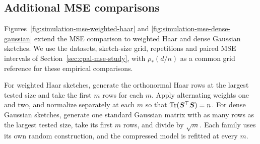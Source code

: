 \documentclass{article}
\theoremstyle{plain} %
\theoremstyle{definition} %
\theoremstyle{definition} %
\begin{document}
\begin{table}[!htbp]
    \centering
    \footnotesize
    \setlength{\tabcolsep}{2.5pt}
    \caption{Paired empirical bias at $n=1000$ in the expanded
    risk-curve study, with 1,000 repetitions per setting. Parentheses
    contain Monte Carlo standard errors of the empirical mean biases. Dashes have the same meaning as in
    Table~\ref{tab:simulation-noninterpolating}, as do WH, DG, G, and U.}
    \label{tab:appendix-accuracy-bias}
    
\end{table}

\begin{table}[tb]
    \centering
    \footnotesize
    \setlength{\tabcolsep}{2.5pt}
    \caption{Empirical RMSE at $n=1000$ in the expanded risk-curve
    study, with 1,000 repetitions per setting. Parentheses contain
    delta-method Monte Carlo standard errors. Dashes have the same
    meaning as in Table~\ref{tab:simulation-noninterpolating}, as do
    WH, DG, G, and U.}
    \label{tab:appendix-accuracy-rmse}
    
\end{table}

\FloatBarrier

\subsection{Additional MSE comparisons}
\label{sec:simulation-complementary-corrected}
\label{sec:simulation-mse-threshold}
\label{app:simulation-mse-sketch-families}
Figures~\ref{fig:simulation-mse-weighted-haar} and
\ref{fig:simulation-mse-dense-gaussian} extend the MSE comparison to
weighted Haar and dense Gaussian sketches. We use the datasets,
sketch-size grid, repetitions and paired MSE intervals of
Section~\ref{sec:cpal-mse-study}, with $\rho_*(d/n)$ as a common grid
reference for these empirical comparisons.

For weighted Haar sketches, generate the orthonormal Haar rows at the
largest tested size and take the first $m$ rows for each $m$.
Apply alternating weights one and two, and normalize separately at each
$m$ so that $\operatorname{Tr}(\boldsymbol{S}^\top\boldsymbol{S})=n$.
For dense Gaussian sketches, generate one standard Gaussian matrix
with as many rows as the largest tested size, take its first $m$ rows,
and divide by $\sqrt m$. Each family uses its own random construction,
and the compressed model is refitted at every $m$.
\end{document}
